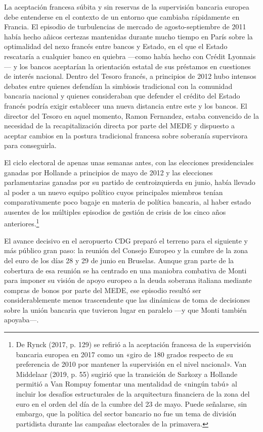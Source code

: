 \documentclass[10pt,a4paper]{article}
\begin{document}
{La aceptación francesa súbita y sin reservas de la supervisión bancaria europea debe entenderse en el contexto de un entorno que cambiaba rápidamente en Francia. El episodio de turbulencias de mercado de agosto-septiembre de 2011 había hecho añicos certezas mantenidas durante mucho tiempo en París sobre la optimalidad del nexo francés entre bancos y Estado, en el que el Estado rescataría a cualquier banco en quiebra —como había hecho con Crédit Lyonnais— y los bancos aceptarían la orientación estatal de sus préstamos en cuestiones de interés nacional. Dentro del Tesoro francés, a principios de 2012 hubo intensos debates entre quienes defendían la simbiosis tradicional con la comunidad bancaria nacional y quienes consideraban que defender el crédito del Estado francés podría exigir establecer una nueva distancia entre este y los bancos. El director del Tesoro en aquel momento, Ramon Fernandez, estaba convencido de la necesidad de la recapitalización directa por parte del MEDE y dispuesto a aceptar cambios en la postura tradicional francesa sobre soberanía supervisora para conseguirla.

El ciclo electoral de apenas unas semanas antes, con las elecciones presidenciales ganadas por Hollande a principios de mayo de 2012 y las elecciones parlamentarias ganadas por su partido de centroizquierda en junio, había llevado al poder a un nuevo equipo político cuyos principales miembros tenían comparativamente poco bagaje en materia de política bancaria, al haber estado ausentes de los múltiples episodios de gestión de crisis de los cinco años anteriores.\footnote{%
    De Rynck (2017, p. 129) se refirió a la aceptación francesa de la supervisión bancaria europea en 2017 como un «giro de 180 grados respecto de su preferencia de 2010 por mantener la supervisión en el nivel nacional». Van Middelaar (2019, p. 55) sugirió que la transición de Sarkozy a Hollande permitió a Van Rompuy fomentar una mentalidad de «ningún tabú» al incluir los desafíos estructurales de la arquitectura financiera de la zona del euro en el orden del día de la cumbre del 23 de mayo. Puede señalarse, sin embargo, que la política del sector bancario no fue un tema de división partidista durante las campañas electorales de la primavera.
}

El avance decisivo en el aeropuerto CDG preparó el terreno para el siguiente y más público gran paso: la reunión del Consejo Europeo y la cumbre de la zona del euro de los días 28 y 29 de junio en Bruselas. Aunque gran parte de la cobertura de esa reunión se ha centrado en una maniobra combativa de Monti para imponer su visión de apoyo europeo a la deuda soberana italiana mediante compras de bonos por parte del MEDE, ese episodio resultó ser considerablemente menos trascendente que las dinámicas de toma de decisiones sobre la unión bancaria que tuvieron lugar en paralelo —y que Monti también apoyaba—.

}
\end{document}
